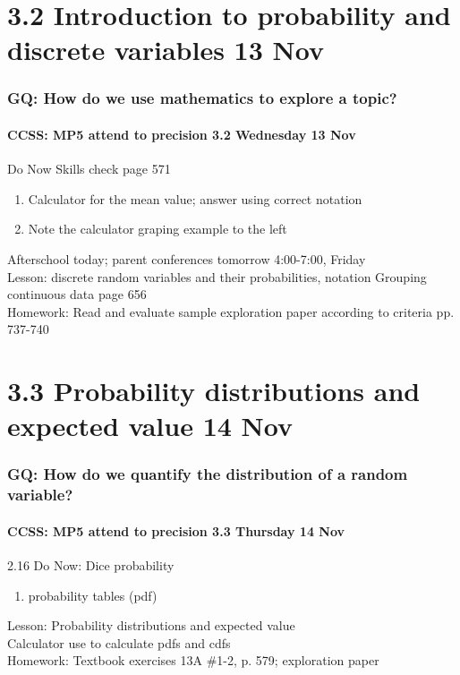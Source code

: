 \documentclass{beamer}
\begin{document}
\section{3.2 Introduction to probability and discrete variables 13 Nov}
\frame
{
  \frametitle{GQ: How do we use mathematics to explore a topic?}
  \framesubtitle{CCSS: MP5 attend to precision \hfill \alert{3.2 Wednesday 13 Nov}}

  \begin{block}{Do Now Skills check page 571}
  \begin{enumerate}
      \item Calculator for the mean value; answer using correct notation 
      \item Note the calculator graping example to the left
  \end{enumerate}
  \end{block}
  Afterschool today; parent conferences tomorrow 4:00-7:00, Friday\\
  Lesson: discrete random variables and their probabilities, notation
  Grouping continuous data page 656\\
  Homework: Read and evaluate sample exploration paper according to criteria pp. 737-740
}

\section{3.3 Probability distributions and expected value 14 Nov}
\frame
{
  \frametitle{GQ: How do we quantify the distribution of a random variable?}
  \framesubtitle{CCSS: MP5 attend to precision \hfill \alert{3.3 Thursday 14 Nov}}

  \begin{block}{2.16 Do Now: Dice probability}
  \begin{enumerate}
      \item probability tables (pdf)
  \end{enumerate}
  \end{block}
  Lesson: Probability distributions and expected value\\ 
  Calculator use to calculate pdfs and cdfs \\ \smallskip
  Homework: Textbook exercises 13A \#1-2, p. 579; exploration paper
}
\end{document}

